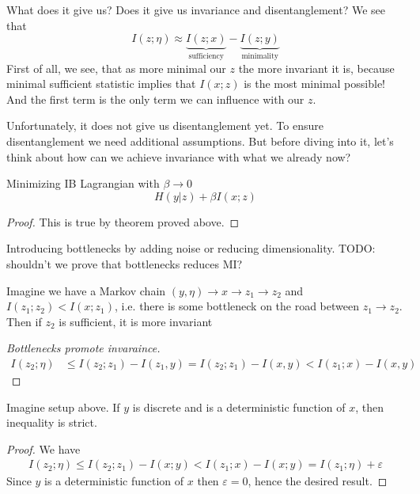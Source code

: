 \documentclass{article}
\begin{document}
What does it give us? Does it give us invariance and disentanglement?
We see that
\[
I(z;\eta) \approx \underbrace{I(z;x)}_{\text{sufficiency}} - \underbrace{I(z;y)}_\text{minimality}
\]
First of all, we see, that as more minimal our $z$ the more invariant it is, because minimal sufficient statistic implies that $I(x;z)$ is the most minimal possible!
And the first term is the only term we can influence with our $z$.

Unfortunately, it does not give us disentanglement yet.
To ensure disentanglement we need additional assumptions.
But before diving into it, let's think about how can we achieve invariance with what we already now?

\begin{corollary}
Minimizing IB Lagrangian with $\beta \to 0$
\[
H(y|z) + \beta I(x;z)
\]
\end{corollary}

\begin{proof}
This is true by theorem proved above.
\end{proof}

Introducing bottlenecks by adding noise or reducing dimensionality.
TODO: shouldn't we prove that bottlenecks reduces MI?
\begin{corollary}
Imagine we have a Markov chain $(y,\eta) \to x \to z_1 \to z_2$ and $I(z_1;z_2) < I(x; z_1)$, i.e. there is some bottleneck on the road between $z_1 \to z_2$. Then if $z_2$ is sufficient, it is more invariant    
\end{corollary}

\begin{proof}[Bottlenecks promote invaraince]
\begin{align*}
I(z_2;\eta) &\leq I(z_2;z_1) - I(z_1,y) = I(z_2; z_1) - I(x, y) < I(z_1; x) - I(x,y)
\end{align*}
\end{proof}

\begin{corollary}
Imagine setup above.
If $y$ is discrete and is a deterministic function of $x$, then inequality is strict.
\end{corollary}

\begin{proof}
We have
\[
\begin{split}
I(z_2; \eta) \leq I(z_2; z_1) - I(x;y) < I(z_1; x) - I(x;y) = I(z_1; \eta) + \varepsilon
\end{split}
\]
Since $y$ is a deterministic function of $x$ then $\varepsilon = 0$, hence the desired result.
\end{proof}
\end{document}
